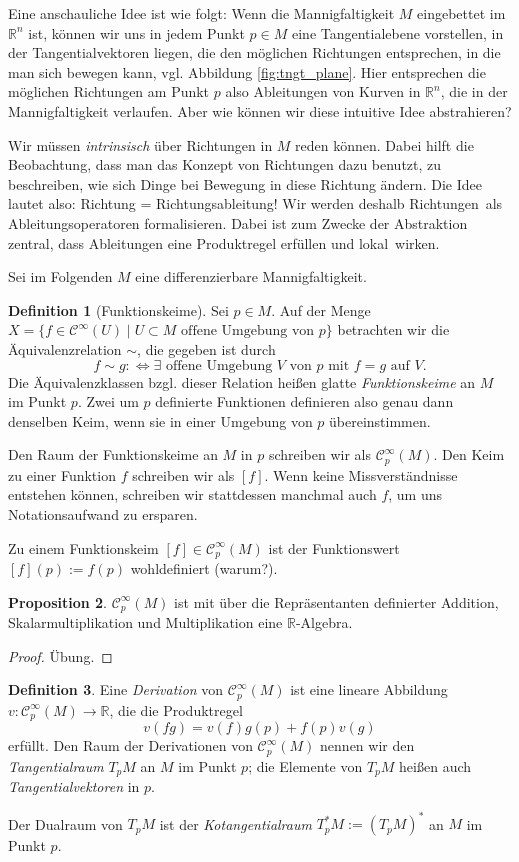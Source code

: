 \documentclass[a4paper]{scrbook}
\numberwithin{equation}{chapter}
\newcommand{\diff}{:\Longleftrightarrow}
\newcommand{\R}{\mathbb{R}}
\newcommand{\sC}{\mathcal{C}^{\infty}}
\theoremstyle{definition}
\newtheorem{defn}{Definition}[section]
\newtheorem{prop}[defn]{Proposition}
\newcommand{\bewUeb}{\begin{proof}Übung.\end{proof}}
\begin{document}
Eine anschauliche Idee ist wie folgt: Wenn die Mannigfaltigkeit $M$ eingebettet im $\mathbb R^n$ ist, können wir uns in jedem Punkt $p \in M$ eine Tangentialebene vorstellen, in der Tangentialvektoren liegen, die den möglichen Richtungen entsprechen, in die man sich bewegen kann, vgl. Abbildung \ref{fig:tngt_plane}. Hier entsprechen die möglichen Richtungen am Punkt $p$ also Ableitungen von Kurven in $\R^n$, die in der Mannigfaltigkeit verlaufen. Aber wie können wir diese intuitive Idee abstrahieren?

Wir müssen \emph{intrinsisch} über Richtungen in $M$ reden können. Dabei hilft die Beobachtung, dass man das Konzept von Richtungen dazu benutzt, zu beschreiben, wie sich Dinge bei Bewegung in diese Richtung ändern. Die Idee lautet also: Richtung = Richtungsableitung! Wir werden deshalb \glqq Richtungen\grqq\ als Ableitungsoperatoren formalisieren. Dabei ist zum Zwecke der Abstraktion zentral, dass Ableitungen eine Produktregel erfüllen und \glqq lokal\grqq\ wirken.

	Sei im Folgenden $M$ eine differenzierbare Mannigfaltigkeit.

\begin{defn}[Funktionskeime]
	Sei $p \in M$. Auf der Menge $X = \{f \in \sC(U) \mid U \subset M \text{ offene Umgebung von } p\}$ betrachten wir die Äquivalenzrelation $\sim$, die gegeben ist durch
	\[f \sim g \diff \exists \text{ offene Umgebung } V \text{ von } p \text{ mit } f = g \text{ auf } V.\]
	Die Äquivalenzklassen bzgl. dieser Relation heißen glatte \emph{Funktionskeime} an $M$ im Punkt $p$. Zwei um $p$ definierte Funktionen definieren also genau dann denselben Keim, wenn sie in einer Umgebung von $p$ übereinstimmen.

	Den Raum der Funktionskeime an $M$ in $p$ schreiben wir als $\sC_p(M)$. Den Keim zu einer Funktion $f$ schreiben wir als $[f]$. Wenn keine Missverständnisse entstehen können, schreiben wir stattdessen manchmal auch $f$, um uns Notationsaufwand zu ersparen.
\end{defn}

Zu einem Funktionskeim $[f] \in \sC_p(M)$ ist der Funktionswert $[f](p) := f(p)$ wohldefiniert (warum?).

\begin{prop}
	$\sC_p(M)$ ist mit über die Repräsentanten definierter Addition, Skalarmultiplikation und Multiplikation eine $\mathbb R$-Algebra. \bewUeb
\end{prop}

\begin{defn}
	Eine \emph{Derivation} von $\sC_p(M)$ ist eine lineare Abbildung $v\colon \sC_p(M) \to \mathbb R$, die die \glqq Produktregel\grqq\ \[v(fg) = v(f) g(p) + f(p) v(g)\] erfüllt. Den Raum der Derivationen von $\sC_p(M)$ nennen wir den \emph{Tangentialraum} $T_pM$ an $M$ im Punkt $p$; die Elemente von $T_pM$ heißen auch \emph{Tangentialvektoren} in $p$.

	Der Dualraum von $T_pM$ ist der \emph{Kotangentialraum} $T_p^*M := (T_pM)^*$ an $M$ im Punkt $p$.
\end{defn}
\end{document}
